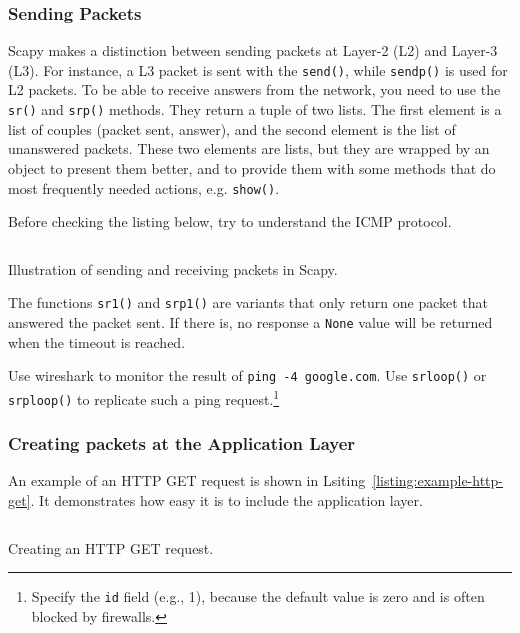\documentclass[11pt,a4paper]{article}
\begin{document}
 \subsubsection{Sending Packets}
 Scapy makes a distinction between sending packets at Layer-2 (L2) and Layer-3 (L3). For instance, a L3 packet is sent with the \texttt{send()}, while \texttt{sendp()} is used for L2 packets. To be able to receive answers from the network, you need to use the \texttt{sr()} and \texttt{srp()} methods. They return a tuple of two lists. The first element is a list of couples (packet sent, answer), and the second element is the list of unanswered packets. These two elements are lists, but they are wrapped by an object to present them better, and to provide them with some methods that do most frequently needed actions, e.g. \texttt{show()}.
 
 \begin{info}
     Before checking the listing below, try to understand the ICMP protocol.
 \end{info}

\begin{listing}[h]
\inputminted{python}{../code_students/example_sr.py}
\caption{Illustration of sending and receiving packets in Scapy.}%
\label{listing:example-sr}
\end{listing}

 The functions \texttt{sr1()}  and \texttt{srp1()} are variants that only return one packet that answered the packet sent. If there is, no response a \texttt{None} value will be returned when the timeout is reached. 
 
 \begin{question}
     Use wireshark to monitor the result of \texttt{ping -4 google.com}.
     Use \texttt{srloop()} or \texttt{srploop()} to replicate such a ping request.\footnote{Specify the \texttt{id} field (e.g., 1), because the default value is zero and is often blocked by firewalls. }
 \end{question}
 
\subsubsection{Creating packets at the Application Layer}
An example of an HTTP GET request is shown in Lsiting~\ref{listing:example-http-get}. It demonstrates how easy it is to include the application layer. 

\begin{listing}[h]
\inputminted{python}{../code_students/example-http-get.py}
\caption{Creating an HTTP GET request.}%
\label{listing:example-http-get}
\end{listing}
\end{document}
